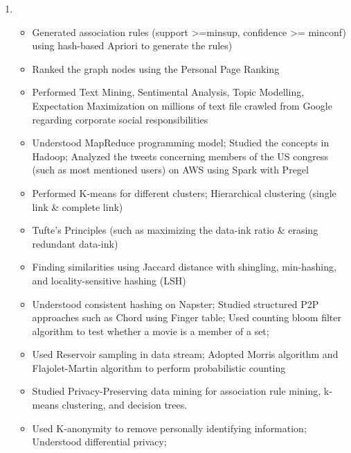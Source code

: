 \begin{enumerate}
    \item{  
    \begin{itemize}
       \item Generated association rules (support >=minsup, confidence >= minconf) using hash-based Apriori to generate the rules)
        \item Ranked the graph nodes using the Personal Page Ranking 
        \item Performed Text Mining, Sentimental Analysis, Topic Modelling, Expectation Maximization on millions of text file crawled from Google regarding corporate social responsibilities 
        \item Understood MapReduce programming model; Studied the concepts in Hadoop; Analyzed the tweets concerning members of the US congress (such as most mentioned users) on AWS using Spark with Pregel 
        \item Performed K-means for different clusters; Hierarchical clustering (single link & complete link) 
        \item Tufte's Principles (such as maximizing the data-ink ratio & erasing redundant data-ink)
        \item Finding similarities using Jaccard distance with shingling, min-hashing, and locality-sensitive hashing (LSH) 
        \item Understood consistent hashing on Napster; Studied structured P2P approaches such as Chord using Finger table; Used counting bloom filter algorithm to test whether a movie is a member of a set;  
        \item Used Reservoir sampling in data stream; Adopted Morris algorithm and Flajolet-Martin algorithm to perform probabilistic counting 
        \item Studied Privacy-Preserving data mining for association rule mining, k-means clustering, and decision trees.  
        \item Used K-anonymity to remove personally identifying information; Understood differential privacy;  
 
    \end{itemize}
    
}
\end{enumerate}
